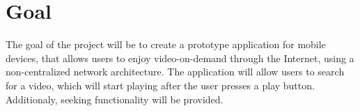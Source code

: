 \section{Goal}
The goal of the project will be to create a prototype application for mobile devices, that allows users to enjoy video-on-demand through the Internet, using a non-centralized network architecture. The application will allow users to search for a video, which will start playing after the user presses a play button. Additionaly, seeking functionality will be provided.
